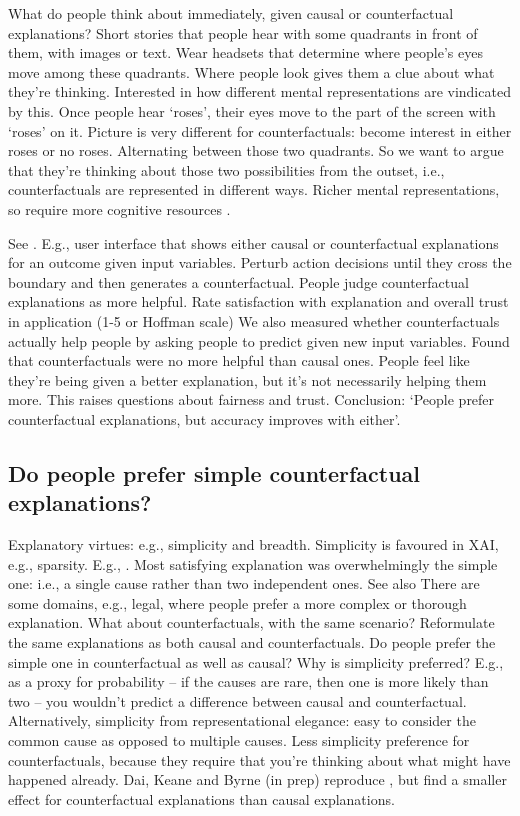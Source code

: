 What do people think about immediately, given causal or counterfactual explanations?
Short stories that people hear with some quadrants in front of them, with images or
text.
Wear headsets that determine where people's eyes move among these quadrants.
Where people look gives them a clue about what they're thinking.
Interested in how different mental representations are vindicated by this.
Once people hear `roses', their eyes move to the part of the screen with `roses' on it.
Picture is very different for counterfactuals: become interest in either roses or no
roses.
Alternating between those two quadrants.
So we want to argue that they're thinking about those two possibilities from the
outset, i.e., counterfactuals are represented in different ways.
Richer mental representations, so require more cognitive resources
\parencites{McEleney2006}.

See \textcites{Celar2023}{Warren2023}{Dai2022}.
E.g., user interface that shows either causal or counterfactual explanations for an
outcome given input variables.
Perturb action decisions until they cross the boundary and then generates a
counterfactual.
People judge counterfactual explanations as more helpful.
Rate satisfaction with explanation and overall trust in application (1-5 or Hoffman
scale) We also measured whether counterfactuals actually help people by asking people
to predict given new input variables.
Found that counterfactuals were no more helpful than causal ones.
People feel like they're being given a better explanation, but it's not necessarily
helping them more.
This raises questions about fairness and trust.
Conclusion: `People prefer counterfactual explanations, but accuracy improves with
either'.

\subsection*{Do people prefer simple counterfactual explanations?}

Explanatory virtues: e.g., simplicity and breadth.
Simplicity is favoured in XAI, e.g., sparsity.
E.g., \textcites{Lombrozo2007}.
Most satisfying explanation was overwhelmingly the simple one: i.e., a single cause
rather than two independent ones.
See also \textcites{Liefgreen2023}{Stephan2023}{Johnson2019} There are some domains,
e.g., legal, where people prefer a more complex or thorough explanation.
What about counterfactuals, with the same scenario?
Reformulate the same explanations as both causal and counterfactuals.
Do people prefer the simple one in counterfactual as well as causal?
Why is simplicity preferred?
E.g., as a proxy for probability -- if the causes are rare, then one is more likely
than two -- you wouldn't predict a difference between causal and counterfactual.
Alternatively, simplicity from representational elegance: easy to consider the common
cause as opposed to multiple causes.
Less simplicity preference for counterfactuals, because they require that you're
thinking about what might have happened already.
Dai, Keane and Byrne (in prep) reproduce \textcites{Lombrozo2007}, but find a smaller
effect for counterfactual explanations than causal explanations.

